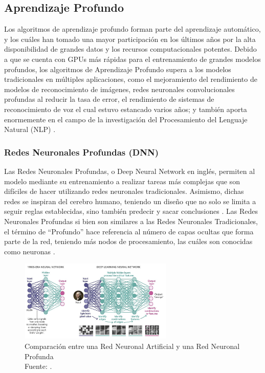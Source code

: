 \subsection{Aprendizaje Profundo}
Los algoritmos de aprendizaje profundo forman parte del aprendizaje automático, y los cuáles han tomado una mayor participación en los últimos años por la alta disponibilidad de grandes datos y los recursos computacionales potentes. Debido a que se cuenta con GPUs más rápidas para el entrenamiento de grandes modelos profundos, los algoritmos de Aprendizaje Profundo supera a los modelos tradicionales en múltiples aplicaciones, como el mejoramiento del rendimiento de modelos de reconocimiento de imágenes, redes neuronales convolucionales profundas al reducir la tasa de error, el rendimiento de sistemas de reconocimiento de voz el cual estuvo estancado varios años; y también aporta enormemente en el campo de la investigación del Procesamiento del Lenguaje Natural (NLP) \parencite{bk_grafo}.

\subsubsection{Redes Neuronales Profundas (DNN)}

Las Redes Neuronales Profundas, o Deep Neural Network en inglés, permiten al modelo mediante su entrenamiento a realizar tareas más complejas que son difíciles de hacer utilizando redes neuronales tradicionales. Asimismo, dichas redes se inspiran del cerebro humano, teniendo un diseño que no solo se limita a seguir reglas establecidas, sino también predecir y sacar conclusiones \parencite{gl_bot}. Las Redes Neuronales Profundas si bien son similares a las Redes Neuronales Tradicionales, el término de “Profundo” hace referencia al número de capas ocultas que forma parte de la red, teniendo más nodos de procesamiento, las cuáles son conocidas como neuronas \parencite{gl_edutech}.
    
\begin{figure}[h]
	\begin{center}
		\includegraphics[width=0.65\textwidth]{2/MT/3.jpg}
		\caption{Comparación entre una Red Neuronal Artificial y una Red Neuronal Profunda \\
			Fuente: \citep*{gl_compara}. }
		\label{1:fig2}
	\end{center}
\end{figure}

